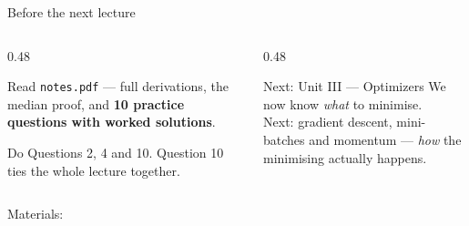 \documentclass[aspectratio=169]{beamer}
\begin{document}
\begin{frame}[shrink=3]{Before the next lecture}
  \begin{columns}[T]
    \begin{column}{0.48\textwidth}
      \begin{block}{Read}
        \texttt{notes.pdf} --- full derivations, the median proof, and
        \textbf{10 practice questions with worked solutions}.
      \end{block}
      \begin{block}{Do}
        Questions 2, 4 and 10. Question 10 ties the whole lecture together.
      \end{block}
    \end{column}
    \begin{column}{0.48\textwidth}
      \begin{exampleblock}{Next: Unit III --- Optimizers}
        We now know \emph{what} to minimise.\\[0.3em]
        Next: gradient descent, mini-batches and momentum --- \emph{how} the
        minimising actually happens.
      \end{exampleblock}
    \end{column}
  \end{columns}
  \begin{center}
    \small Materials: \texttt{\AMLRepoURL}
  \end{center}
  \slidesources{\AMLUnitIISources}
\end{frame}
\end{document}

